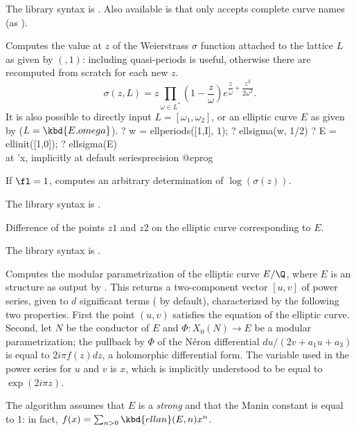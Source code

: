The library syntax is .
Also available is  that only
accepts complete curve names (as ).

\label{se:ellsigma}
Computes the value at $z$ of the Weierstrass $\sigma$ function attached to
the lattice $L$ as given by $(,1)$: including quasi-periods
is useful, otherwise there are recomputed from scratch for each new $z$.
$$ \sigma(z, L) = z \prod_{\omega\in L^*} \left(1 -
\dfrac{z}{\omega}\right)e^{\dfrac{z}{\omega} + \dfrac{z^2}{2\omega^2}}.$$
It is also possible to directly input $L = [\omega_1,\omega_2]$,
or an elliptic curve $E$ as given by  ($L = \kbd{E.omega}$).
\bprog
? w = ellperiods([1,I], 1);
? ellsigma(w, 1/2)
? E = ellinit([1,0]);
? ellsigma(E) \\ at 'x, implicitly at default seriesprecision
@eprog

If $\fl=1$, computes an arbitrary determination of $\log(\sigma(z))$.

The library syntax is .

\label{se:ellsub}
Difference of the points $z1$ and $z2$ on the
elliptic curve corresponding to $E$.

The library syntax is .

\label{se:elltaniyama}
Computes the modular parametrization of the elliptic curve $E/\Q$,
where $E$ is an  structure as output by . This returns
a two-component vector $[u,v]$ of power series, given to $d$ significant
terms ( by default), characterized by the following two
properties. First the point $(u,v)$ satisfies the equation of the elliptic
curve. Second, let $N$ be the conductor of $E$ and $\Phi: X_0(N)\to E$
be a modular parametrization; the pullback by $\Phi$ of the
N\'eron differential $du/(2v+a_1u+a_3)$ is equal to $2i\pi
f(z)dz$, a holomorphic differential form. The variable used in the power
series for $u$ and $v$ is $x$, which is implicitly understood to be equal to
$\exp(2i\pi z)$.

The algorithm assumes that $E$ is a \emph{strong} 
and that the Manin constant is equal to 1: in fact, $f(x) = \sum_{n > 0}
\kbd{ellan}(E, n) x^n$.

